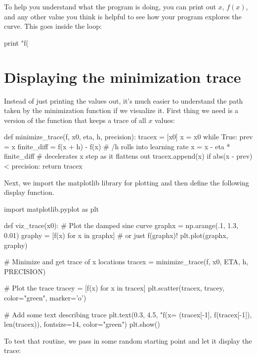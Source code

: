 \documentclass[titlepage]{tufte-book}
\begin{document}
\begin{fullwidth}
To help you understand what the program is doing, you can print out $x$, $f(x)$, and any other value you think is helpful to see how your program explores the curve. This goes inside the loop:

\begin{pyverbatim}
print "f(%
\end{pyverbatim}

\section{Displaying the minimization trace}

Instead of just printing the values out, it's much easier to understand the path taken by the minimization function if we visualize it. First thing we need is a version of the function that keeps a trace of all $x$ values:

\begin{pyverbatim}
def minimize_trace(f, x0, eta, h, precision):
    tracex = [x0]
    x = x0
    while True:
        prev = x
        finite_diff = f(x + h) - f(x)  # /h rolls into learning rate
        x = x - eta * finite_diff  # decelerates x step as it flattens out
        tracex.append(x)
        if abs(x - prev) < precision:
            return tracex
\end{pyverbatim}

\noindent Next, we import the matplotlib library for plotting and then define the following display function.

\begin{pyverbatim}
import matplotlib.pyplot as plt

def viz_trace(x0):
    # Plot the damped sine curve
    graphx = np.arange(.1, 1.3, 0.01)
    graphy = [f(x) for x in graphx] # or just f(graphx)!
    plt.plot(graphx, graphy)

    # Minimize and get trace of x locations
    tracex = minimize_trace(f, x0, ETA, h, PRECISION)

    # Plot the trace
    tracey = [f(x) for x in tracex]
    plt.scatter(tracex, tracey, color="green", marker='o')
    
    # Add some text describing trace
    plt.text(0.3, 4.5, "f(x=%
             (tracex[-1], f(tracex[-1]), len(tracex)), fontsize=14,
             color="green")
    plt.show()
\end{pyverbatim}

\noindent To test that routine, we pass in some random starting point and let it display the trace:


\end{fullwidth}
\end{document}

